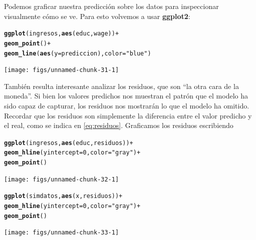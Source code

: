 \documentclass{report}\usepackage[]{graphicx}\usepackage[]{color}
\makeatletter
\newcommand{\hlnum}[1]{\textcolor[rgb]{0.686,0.059,0.569}{#1}}%
\newcommand{\hlstr}[1]{\textcolor[rgb]{0.192,0.494,0.8}{#1}}%
\newcommand{\hlopt}[1]{\textcolor[rgb]{0,0,0}{#1}}%
\newcommand{\hlstd}[1]{\textcolor[rgb]{0.345,0.345,0.345}{#1}}%
\newcommand{\hlkwc}[1]{\textcolor[rgb]{0.333,0.667,0.333}{#1}}%
\newcommand{\hlkwd}[1]{\textcolor[rgb]{0.737,0.353,0.396}{\textbf{#1}}}%
\newenvironment{kframe}{%
 \def\at@end@of@kframe{}%
 \ifinner\ifhmode%
  \def\at@end@of@kframe{\end{minipage}}%
  \begin{minipage}{\columnwidth}%
 \fi\fi%
 \def\FrameCommand##1{\hskip\@totalleftmargin \hskip-\fboxsep
 \colorbox{shadecolor}{##1}\hskip-\fboxsep
     \hskip-\linewidth \hskip-\@totalleftmargin \hskip\columnwidth}%
 \MakeFramed {\advance\hsize-\width
   \@totalleftmargin\z@ \linewidth\hsize
   \@setminipage}}%
 {\par\unskip\endMakeFramed%
 \at@end@of@kframe}
\newenvironment{knitrout}{}{} %
\newcommand*{\paq}[1]{\textbf{#1}\index{#1@\textbf{#1}}}
\makeatother
\begin{document}
Podemos graficar nuestra predicción sobre los datos para inspeccionar visualmente cómo se ve. Para esto volvemos a usar \paq{ggplot2}:
\begin{knitrout}
\color{fgcolor}\begin{kframe}
\begin{alltt}
\hlkwd{ggplot}\hlstd{(ingresos,} \hlkwd{aes}\hlstd{(educ, wage))} \hlopt{+}
  \hlkwd{geom_point}\hlstd{()} \hlopt{+}
  \hlkwd{geom_line}\hlstd{(}\hlkwd{aes}\hlstd{(}\hlkwc{y} \hlstd{= prediccion),} \hlkwc{color} \hlstd{=} \hlstr{"blue"}\hlstd{)}
\end{alltt}
\end{kframe}

{\centering \texttt{[image: figs/unnamed-chunk-31-1]} 

}



\end{knitrout}

También resulta interesante analizar los residuos, que son ``la otra cara de la moneda''. Si bien los valores predichos nos muestran el patrón que el modelo ha sido capaz de capturar, los residuos nos mostrarán lo que el modelo ha omitido. Recordar que los residuos son simplemente la diferencia entre el valor predicho y el real, como se indica en \eqref{eq:residuos}. Graficamos los residuos escribiendo

\begin{knitrout}
\color{fgcolor}\begin{kframe}
\begin{alltt}
\hlkwd{ggplot}\hlstd{(ingresos,} \hlkwd{aes}\hlstd{(educ, residuos))} \hlopt{+}
  \hlkwd{geom_hline}\hlstd{(}\hlkwc{yintercept} \hlstd{=} \hlnum{0}\hlstd{,} \hlkwc{color} \hlstd{=} \hlstr{"gray"}\hlstd{)} \hlopt{+}
  \hlkwd{geom_point}\hlstd{()}
\end{alltt}
\end{kframe}

{\centering \texttt{[image: figs/unnamed-chunk-32-1]} 

}



\end{knitrout}

\begin{knitrout}
\color{fgcolor}\begin{kframe}
\begin{alltt}
\hlkwd{ggplot}\hlstd{(simdatos,} \hlkwd{aes}\hlstd{(x, residuos))} \hlopt{+}
  \hlkwd{geom_hline}\hlstd{(}\hlkwc{yintercept} \hlstd{=} \hlnum{0}\hlstd{,} \hlkwc{color} \hlstd{=} \hlstr{"gray"}\hlstd{)} \hlopt{+}
  \hlkwd{geom_point}\hlstd{()}
\end{alltt}
\end{kframe}

{\centering \texttt{[image: figs/unnamed-chunk-33-1]} 

}



\end{knitrout}
\end{document}
